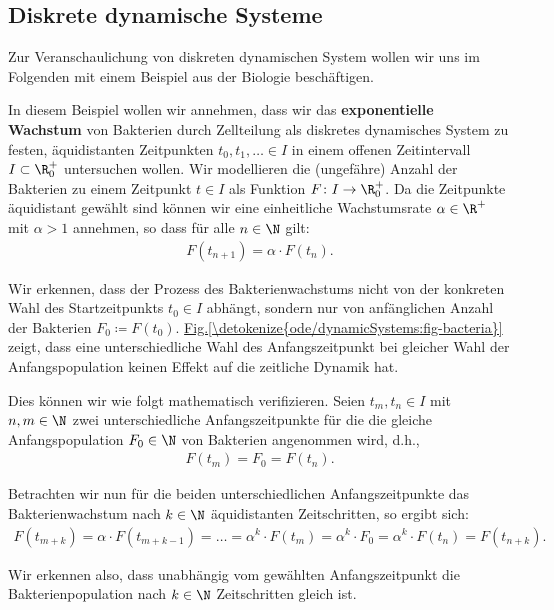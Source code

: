 \documentclass[letterpaper,10pt,english]{jupyterBook}
\begin{document}
\subsection{Diskrete dynamische Systeme}
\label{\detokenize{ode/dynamicSystems:diskrete-dynamische-systeme}}
\par
Zur Veranschaulichung von diskreten dynamischen System wollen wir uns im Folgenden mit einem Beispiel aus der Biologie beschäftigen.
\label{ode/dynamicSystems:ex:bacteria}
\begin{example}{}{}



\par
In diesem Beispiel wollen wir annehmen, dass wir das \textbf{exponentielle Wachstum} von Bakterien durch Zellteilung als diskretes dynamisches System zu festen, äquidistanten Zeitpunkten \(t_0, t_1, \ldots \in I\) in einem offenen Zeitintervall \(I\subset\R^+_0\) untersuchen wollen.
Wir modellieren die (ungefähre) Anzahl der Bakterien zu einem Zeitpunkt \(t \in I\) als Funktion \(F \colon I \rightarrow \R_0^+\).
Da die Zeitpunkte äquidistant gewählt sind können wir eine einheitliche Wachstumsrate \(\alpha \in \R^+\) mit \(\alpha > 1\) annehmen, so dass für alle \(n \in \N\) gilt:
\begin{align*}
F(t_{n+1}) = \alpha \cdot F(t_n).
\end{align*}
\par
Wir erkennen, dass der Prozess des Bakterienwachstums nicht von der konkreten Wahl des Startzeitpunkts \(t_0 \in I\) abhängt, sondern nur von anfänglichen Anzahl der Bakterien \(F_0 \coloneqq F(t_0)\). \hyperref[\detokenize{ode/dynamicSystems:fig-bacteria}]{Fig.\@ \ref{\detokenize{ode/dynamicSystems:fig-bacteria}}} zeigt, dass eine unterschiedliche Wahl des Anfangszeitpunkt bei gleicher Wahl der Anfangspopulation keinen Effekt auf die zeitliche Dynamik hat.

\par
Dies können wir wie folgt mathematisch verifizieren. Seien \(t_m, t_n \in I\) mit \(n,m \in \N\) zwei unterschiedliche Anfangszeitpunkte für die die gleiche Anfangspopulation \(F_0 \in \N\) von Bakterien angenommen wird, d.h.,
\begin{align*}
F(t_m) = F_0 = F(t_n).
\end{align*}
\par
Betrachten wir nun für die beiden unterschiedlichen Anfangszeitpunkte das Bakterienwachstum nach \(k \in \N\) äquidistanten Zeitschritten, so ergibt sich:
\begin{align*}
F(t_{m+k}) = \alpha \cdot F(t_{m+k-1}) = \ldots = \alpha^k \cdot F(t_{m}) = \alpha^k \cdot F_0 = \alpha^k \cdot F(t_n) = F(t_{n+k}).
\end{align*}
\par
Wir erkennen also, dass unabhängig vom gewählten Anfangszeitpunkt die Bakterienpopulation nach \(k \in \N\) Zeitschritten gleich ist.
\end{example}
\end{document}
